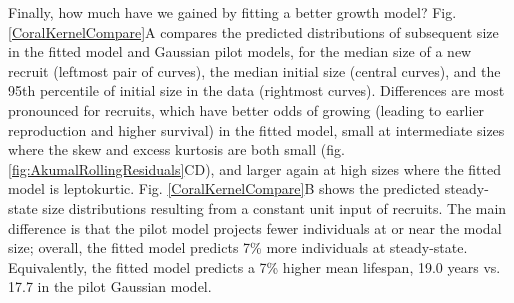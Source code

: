 \documentclass[11pt]{article}
\begin{document}
{Finally, how much have we gained by fitting a better growth model? Fig. \ref{CoralKernelCompare}A
compares the predicted distributions of subsequent size in the fitted model and Gaussian pilot models, for the median size of a new recruit 
(leftmost pair of curves), the median initial size (central curves), and the 95th percentile of initial size in the data (rightmost
curves). Differences are most pronounced for recruits, which have better odds of growing (leading to earlier reproduction and higher
survival) in the fitted model, small at intermediate sizes where the skew and excess kurtosis are both small (fig. \ref{fig:AkumalRollingResiduals}CD),
and larger again at high sizes where the fitted model is leptokurtic. Fig. \ref{CoralKernelCompare}B shows the predicted steady-state size
distributions resulting from a constant unit input of recruits. The main difference is that the pilot model projects fewer individuals at
or near the modal size; overall, the fitted model predicts 7\% more individuals at steady-state. Equivalently, the fitted
model predicts a 7\% higher mean lifespan, 19.0 years vs. 17.7 in the pilot Gaussian model. 

}
\end{document}
